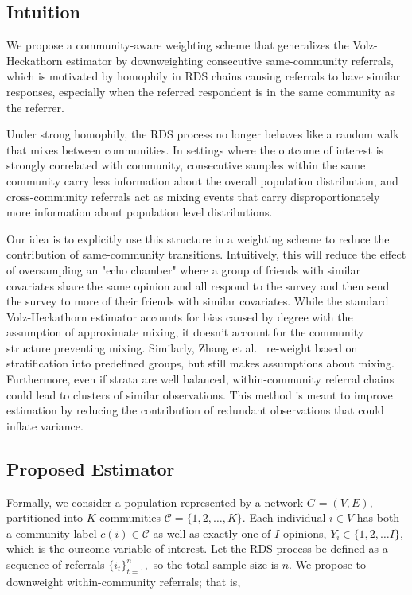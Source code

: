 \documentclass[11pt,a4paper,twocolumn,twoside]{rho-class/rho}
\begin{document}
\subsection{Intuition}
We propose a community-aware weighting scheme that generalizes the Volz-Heckathorn estimator by downweighting consecutive same-community referrals, which is motivated by homophily in RDS chains causing referrals to have similar responses, especially when the referred respondent is in the same community as the referrer.

Under strong homophily, the RDS process no longer behaves like a random walk that mixes between communities. In settings where the outcome of interest is strongly correlated with community, consecutive samples within the same community carry less information about the overall population distribution, and cross-community referrals act as mixing events that carry disproportionately more information about population level distributions.

Our idea is to explicitly use this structure in a weighting scheme to reduce the contribution of same-community transitions. Intuitively, this will reduce the effect of oversampling an "echo chamber" where a group of friends with similar covariates share the same opinion and all respond to the survey and then send the survey to more of their friends with similar covariates. While the standard Volz-Heckathorn estimator accounts for bias caused by degree with the assumption of approximate mixing, it doesn't account for the community structure preventing mixing. Similarly, Zhang et al.~\cite{zhang2018post} re-weight based on stratification into predefined groups, but still makes assumptions about mixing. Furthermore, even if strata are well balanced, within-community referral chains could lead to clusters of similar  observations.
This method is meant to improve estimation by reducing the contribution of redundant observations that could inflate variance.

\subsection{Proposed Estimator} \label{subsec:proposed_estimator}
Formally, we consider a population represented by a network $G = (V, E),$ partitioned into $K$ communities $\mathcal{C} = \{1, 2, \ldots, K\}.$ Each individual $i \in V$ has both a community label $c(i) \in \mathcal{C}$ as well as exactly one of $I$ opinions, $Y_i \in \{1, 2, \ldots I\}$, which is the ourcome variable of interest. 
Let the RDS process be defined as a sequence of referrals $\{i_t\}_{t = 1}^n,$ so the total sample size is $n$. We propose to downweight within-community referrals; that is,
\end{document}
